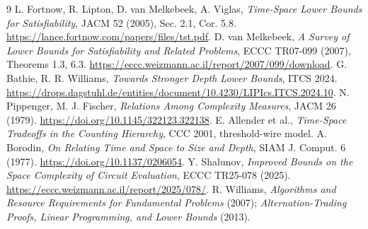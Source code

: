 \documentclass[11pt]{article}
\begin{document}
\begin{thebibliography}{9}
 L. Fortnow, R. Lipton, D. van Melkebeek, A. Viglas, \emph{Time-Space Lower Bounds for Satisfiability}, JACM 52 (2005), Sec. 2.1, Cor. 5.8. \url{https://lance.fortnow.com/papers/files/tst.pdf}.
 D. van Melkebeek, \emph{A Survey of Lower Bounds for Satisfiability and Related Problems}, ECCC TR07-099 (2007), Theorems 1.3, 6.3. \url{https://eccc.weizmann.ac.il/report/2007/099/download}.
 G. Bathie, R. R. Williams, \emph{Towards Stronger Depth Lower Bounds}, ITCS 2024. \url{https://drops.dagstuhl.de/entities/document/10.4230/LIPIcs.ITCS.2024.10}.
 N. Pippenger, M. J. Fischer, \emph{Relations Among Complexity Measures}, JACM 26 (1979). \url{https://doi.org/10.1145/322123.322138}.
 E. Allender et al., \emph{Time-Space Tradeoffs in the Counting Hierarchy}, CCC 2001, threshold-wire model.
 A. Borodin, \emph{On Relating Time and Space to Size and Depth}, SIAM J. Comput. 6 (1977). \url{https://doi.org/10.1137/0206054}.
 Y. Shalunov, \emph{Improved Bounds on the Space Complexity of Circuit Evaluation}, ECCC TR25-078 (2025). \url{https://eccc.weizmann.ac.il/report/2025/078/}.
 R. Williams, \emph{Algorithms and Resource Requirements for Fundamental Problems} (2007); \emph{Alternation-Trading Proofs, Linear Programming, and Lower Bounds} (2013).
\end{thebibliography}
\end{document}

